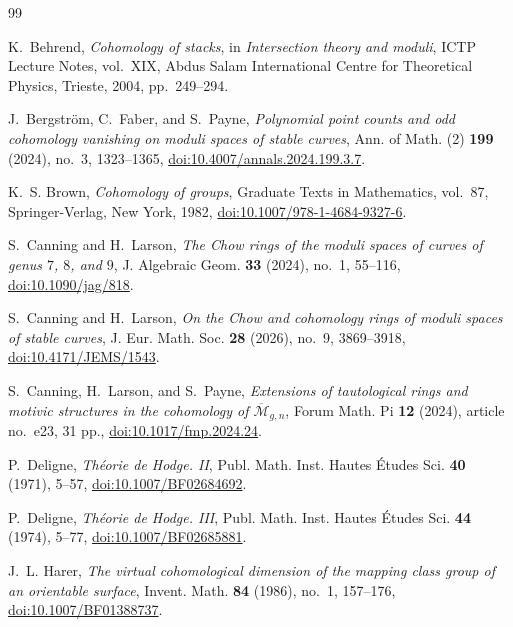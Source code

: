 \documentclass[12pt,reqno]{amsart}
\theoremstyle{definition}
\theoremstyle{remark}
\begin{document}
\begin{thebibliography}{99}

K.~Behrend,
\emph{Cohomology of stacks},
in \emph{Intersection theory and moduli}, ICTP Lecture Notes, vol.~XIX,
Abdus Salam International Centre for Theoretical Physics, Trieste, 2004,
pp.~249--294.

J.~Bergstr\"om, C.~Faber, and S.~Payne,
\emph{Polynomial point counts and odd cohomology vanishing on moduli spaces
of stable curves},
Ann. of Math. (2) \textbf{199} (2024), no.~3, 1323--1365,
\href{https://doi.org/10.4007/annals.2024.199.3.7}
{doi:10.4007/annals.2024.199.3.7}.

K.~S. Brown,
\emph{Cohomology of groups},
Graduate Texts in Mathematics, vol.~87, Springer-Verlag, New York, 1982,
\href{https://doi.org/10.1007/978-1-4684-9327-6}
{doi:10.1007/978-1-4684-9327-6}.

S.~Canning and H.~Larson,
\emph{The Chow rings of the moduli spaces of curves of genus $7$, $8$, and
$9$},
J. Algebraic Geom. \textbf{33} (2024), no.~1, 55--116,
\href{https://doi.org/10.1090/jag/818}{doi:10.1090/jag/818}.

S.~Canning and H.~Larson,
\emph{On the Chow and cohomology rings of moduli spaces of stable curves},
J. Eur. Math. Soc. \textbf{28} (2026), no.~9, 3869--3918,
\href{https://doi.org/10.4171/JEMS/1543}{doi:10.4171/JEMS/1543}.

S.~Canning, H.~Larson, and S.~Payne,
\emph{Extensions of tautological rings and motivic structures in the
cohomology of $\overline{\mathcal M}_{g,n}$},
Forum Math. Pi \textbf{12} (2024), article no.~e23, 31 pp.,
\href{https://doi.org/10.1017/fmp.2024.24}{doi:10.1017/fmp.2024.24}.

P.~Deligne,
\emph{Th\'eorie de Hodge. II},
Publ. Math. Inst. Hautes \'Etudes Sci. \textbf{40} (1971), 5--57,
\href{https://doi.org/10.1007/BF02684692}{doi:10.1007/BF02684692}.

P.~Deligne,
\emph{Th\'eorie de Hodge. III},
Publ. Math. Inst. Hautes \'Etudes Sci. \textbf{44} (1974), 5--77,
\href{https://doi.org/10.1007/BF02685881}{doi:10.1007/BF02685881}.

J.~L. Harer,
\emph{The virtual cohomological dimension of the mapping class group of an
orientable surface},
Invent. Math. \textbf{84} (1986), no.~1, 157--176,
\href{https://doi.org/10.1007/BF01388737}{doi:10.1007/BF01388737}.


\end{thebibliography}
\end{document}
